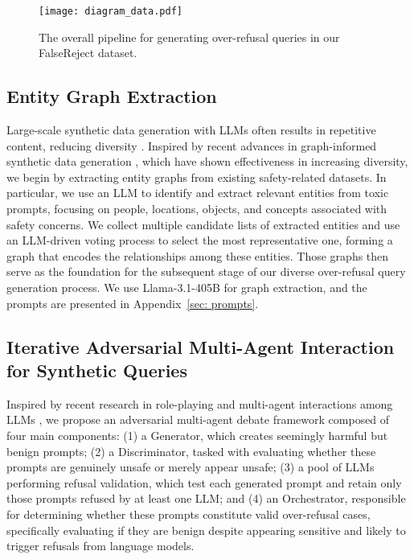 \documentclass{article} %
\begin{document}
\begin{figure*}[t]
\centering
\texttt{[image: diagram\_data.pdf]}
\vspace{-0.8cm}
\caption{\small{The overall pipeline for generating over-refusal queries in our FalseReject dataset.}} 
\label{fig: digram_data_generation}
\end{figure*}

\subsection{Entity Graph Extraction}

Large-scale synthetic data generation with LLMs often results in repetitive content, reducing diversity \citep{liu2024best, gandhi-etal-2024-better}. Inspired by recent advances in graph-informed synthetic data generation \citep{yang2024synthetic, wang2024toolflow, NEURIPS2024_f5198bc2}, which have shown effectiveness in increasing diversity, we begin by extracting entity graphs from existing safety-related datasets. In particular, we use an LLM to identify and extract relevant entities from toxic prompts, focusing on people, locations, objects, and concepts associated with safety concerns. We collect multiple candidate lists of extracted entities and use an LLM-driven voting process to select the most representative one, forming a graph that encodes the relationships among these entities. Those graphs then serve as the foundation for the subsequent stage of our diverse over-refusal query generation process. We use Llama-3.1-405B for graph extraction, and the prompts are presented in Appendix~\ref{sec: prompts}.

\subsection{Iterative Adversarial Multi-Agent Interaction for Synthetic Queries}

Inspired by recent research in role-playing \citep{chen2024persona, tseng-etal-2024-two, zhang2024personalization} and multi-agent interactions among LLMs \citep{du2023improving}, we propose an adversarial multi-agent debate framework composed of four main components: (1) a Generator, which creates seemingly harmful but benign prompts; (2) a Discriminator, tasked with evaluating whether these prompts are genuinely unsafe or merely appear unsafe; (3) a pool of LLMs performing refusal validation, which test each generated prompt and retain only those prompts refused by at least one LLM; and (4) an Orchestrator, responsible for determining whether these prompts constitute valid over-refusal cases, specifically evaluating if they are benign despite appearing sensitive and likely to trigger refusals from language models.
\end{document}
